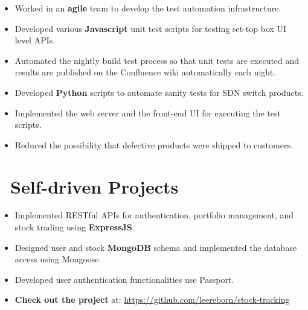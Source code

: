\documentclass{resume}
\begin{document}
\begin{itemize}
	\item Worked in an \textbf{agile} team to develop the test automation infrastructure.
	\item Developed various \textbf{Javascript} unit test scripts for testing set-top box UI level APIs.
	\item Automated the nightly build test process so that unit tests are executed and results are published on the Confluence wiki automatically each night.
\end{itemize}

\begin{itemize}
	\item Developed \textbf{Python} scripts to automate sanity tests for SDN switch products.
	\item Implemented the web server and the front-end UI for executing the test scripts.
	\item Reduced the possibility that defective products were shipped to customers.
\end{itemize}

\section{\faUsers\ Self-driven Projects}
\begin{itemize}
	\item Implemented RESTful APIs for authentication, portfolio management, and stock trading using \textbf{ExpressJS}.
	\item Designed user and stock \textbf{MongoDB} schema and implemented the database access using Mongoose.
	\item Developed user authentication functionalities use Passport.
	\item \textbf{Check out the project} at: \url{https://github.com/leereborn/stock-tracking}
\end{itemize}
\end{document}
